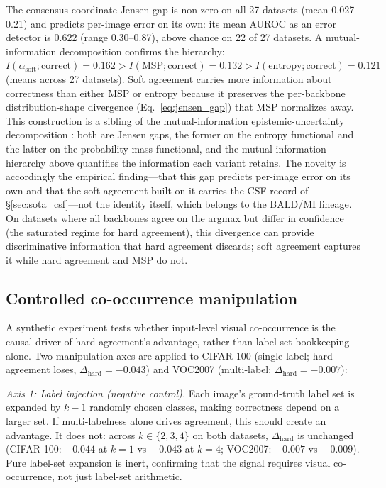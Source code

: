\documentclass[a4paper,fleqn]{cas-sc}
\begin{document}
The consensus-coordinate Jensen gap is non-zero on all 27 datasets (mean 0.027--0.21) and predicts per-image error on its own: its mean AUROC as an error detector is 0.622 (range 0.30--0.87), above chance on 22 of 27 datasets.
A mutual-information decomposition confirms the hierarchy: $I(\alpha_{\text{soft}}; \text{correct}) = 0.162 > I(\text{MSP}; \text{correct}) = 0.132 > I(\text{entropy}; \text{correct}) = 0.121$ (means across 27 datasets).
Soft agreement carries more information about correctness than either MSP or entropy because it preserves the per-backbone distribution-shape divergence (Eq.~\eqref{eq:jensen_gap}) that MSP normalizes away.
This construction is a sibling of the mutual-information epistemic-uncertainty decomposition \citep{houlsby2011bald}: both are Jensen gaps, the former on the entropy functional and the latter on the probability-mass functional, and the mutual-information hierarchy above quantifies the information each variant retains. The novelty is accordingly the empirical finding---that this gap predicts per-image error on its own and that the soft agreement built on it carries the CSF record of \S\ref{sec:sota_csf}---not the identity itself, which belongs to the BALD/MI lineage.
On datasets where all backbones agree on the argmax but differ in confidence (the saturated regime for hard agreement), this divergence can provide discriminative information that hard agreement discards; soft agreement captures it while hard agreement and MSP do not.


\subsection{Controlled co-occurrence manipulation}
\label{sec:cooccurrence_manip}

A synthetic experiment tests whether input-level visual co-occurrence is the causal driver of hard agreement's advantage, rather than label-set bookkeeping alone.
Two manipulation axes are applied to CIFAR-100 (single-label; hard agreement loses, $\Delta_{\text{hard}} = -0.043$) and VOC2007 (multi-label; $\Delta_{\text{hard}} = -0.007$):

\textit{Axis 1: Label injection (negative control).}
Each image's ground-truth label set is expanded by $k{-}1$ randomly chosen classes, making correctness depend on a larger set.
If multi-labelness alone drives agreement, this should create an advantage.
It does not: across $k \in \{2,3,4\}$ on both datasets, $\Delta_{\text{hard}}$ is unchanged (CIFAR-100: $-0.044$ at $k{=}1$ vs~$-0.043$ at $k{=}4$; VOC2007: $-0.007$ vs~$-0.009$).
Pure label-set expansion is inert, confirming that the signal requires visual co-occurrence, not just label-set arithmetic.
\end{document}
